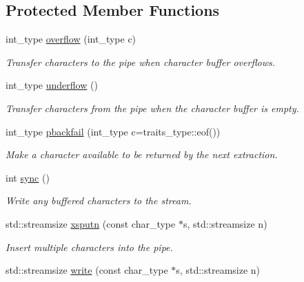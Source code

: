 \subsection*{Protected Member Functions}
\begin{DoxyCompactItemize}
\item 
int\+\_\+type \mbox{\hyperlink{classredi_1_1basic__pstreambuf_a563d5dbb28ee2713933e648bd839be2d}{overflow}} (int\+\_\+type c)
\begin{DoxyCompactList}\small\item\em Transfer characters to the pipe when character buffer overflows. \end{DoxyCompactList}\item 
int\+\_\+type \mbox{\hyperlink{classredi_1_1basic__pstreambuf_af7c2677fc95c3f3debf8ec169684703b}{underflow}} ()
\begin{DoxyCompactList}\small\item\em Transfer characters from the pipe when the character buffer is empty. \end{DoxyCompactList}\item 
int\+\_\+type \mbox{\hyperlink{classredi_1_1basic__pstreambuf_accbff787187463c3ff1e76a3abb75adc}{pbackfail}} (int\+\_\+type c=traits\+\_\+type\+::eof())
\begin{DoxyCompactList}\small\item\em Make a character available to be returned by the next extraction. \end{DoxyCompactList}\item 
\mbox{\label{classredi_1_1basic__pstreambuf_a65d46d50b5f0959dc40d0e254f2edff8}} 
int \mbox{\hyperlink{classredi_1_1basic__pstreambuf_a65d46d50b5f0959dc40d0e254f2edff8}{sync}} ()
\begin{DoxyCompactList}\small\item\em Write any buffered characters to the stream. \end{DoxyCompactList}\item 
std\+::streamsize \mbox{\hyperlink{classredi_1_1basic__pstreambuf_a329b61903a31fa3113b583f0be9fbf8d}{xsputn}} (const char\+\_\+type $\ast$s, std\+::streamsize n)
\begin{DoxyCompactList}\small\item\em Insert multiple characters into the pipe. \end{DoxyCompactList}\item 
std\+::streamsize \mbox{\hyperlink{classredi_1_1basic__pstreambuf_a48f8ea6b033a4623ce854363a64b908a}{write}} (const char\+\_\+type $\ast$s, std\+::streamsize n)

\end{DoxyCompactItemize}
